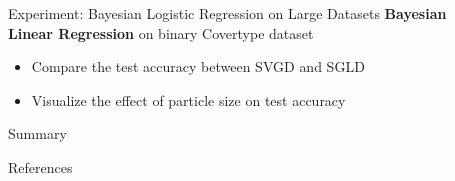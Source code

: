\documentclass[final]{beamer}
\newlength{\sepwidth}
\newlength{\colwidth}
\newcommand{\separatorcolumn}{\begin{column}{\sepwidth}\end{column}}
\begin{document}
\begin{frame}[t]
\begin{columns}[t]
\begin{column}{\colwidth}
\end{column}

\separatorcolumn

\begin{column}{\colwidth}

  \begin{block}{Experiment: Bayesian Logistic Regression on Large Datasets}
  \textbf{Bayesian Linear Regression} on binary Covertype dataset 
    \begin{itemize}
     \item Compare the test accuracy between SVGD \cite{liu2016stein} and SGLD \cite{welling2011bayesian}
     \item Visualize the effect of particle size on test accuracy
    \end{itemize}
    
  \end{block}
  
\begin{block}{Summary}
\end{block}

  \begin{block}{References}

    \nocite{*}
    \footnotesize{}

  \end{block}
  
\end{column}

\separatorcolumn

\end{columns}
\end{frame}
\end{document}
